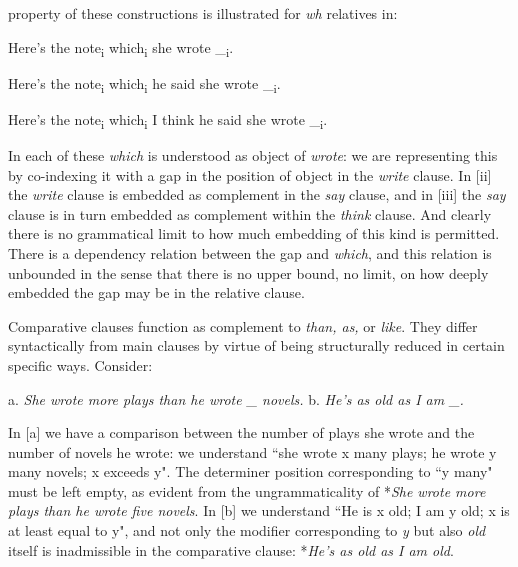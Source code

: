 \noindent property of these constructions is illustrated for \textit{wh} relatives in:
\begin{examples}
\item \label{ex:39}
    \begin{examples}
        \item Here's the note\textsubscript{i} \ob which\textsubscript{i} she wrote \_\textsubscript{i}\cb.
        \item Here's the note\textsubscript{i} \ob which\textsubscript{i} he said she wrote \_\textsubscript{i}\cb.
        \item Here's the note\textsubscript{i} \ob which\textsubscript{i} I think he said she wrote \_\textsubscript{i}\cb.
    \end{examples}
\end{examples}
In each of these \textit{which} is understood as object of \textit{wrote}: we are representing this by co-indexing it with a gap in the position of object in the \textit{write} clause. In [ii] the \textit{write} clause is embedded as complement in the \textit{say} clause, and in [iii] the \textit{say} clause is in turn embedded as complement within the \textit{think} clause. And clearly there is no grammatical limit to how much embedding of this kind is permitted. There is a dependency relation between the gap and \textit{which}, and this relation is {unbounded} in the sense that there is no upper bound, no limit, on how deeply embedded the gap may be in the relative clause.


Comparative clauses function as complement to \textit{than, as,} or \textit{like}. They differ syntactically from main clauses by virtue of being structurally reduced in certain specific ways. Consider:
\begin{examples}
\item \label{ex:40}
        a. \textit{She wrote more plays than \ob he wrote \_ novels\cb.} \hspace{2em} b. \textit{He's as old as \ob I am \_\cb.}
\end{examples}
In [a] we have a comparison between the number of plays she wrote and the number of novels he wrote: we understand ``she wrote x many plays; he wrote y many novels; x exceeds y". The determiner position corresponding to ``y many" must be left empty, as evident from the ungrammaticality of *\textit{She wrote more plays than he wrote five novels}. In [b] we understand ``He is x old; I am y old; x is at least equal to y", and not only the modifier corresponding to \textit{y} but also \textit{old} itself is inadmissible in the comparative clause: *\textit{He's as old as I am old}.

